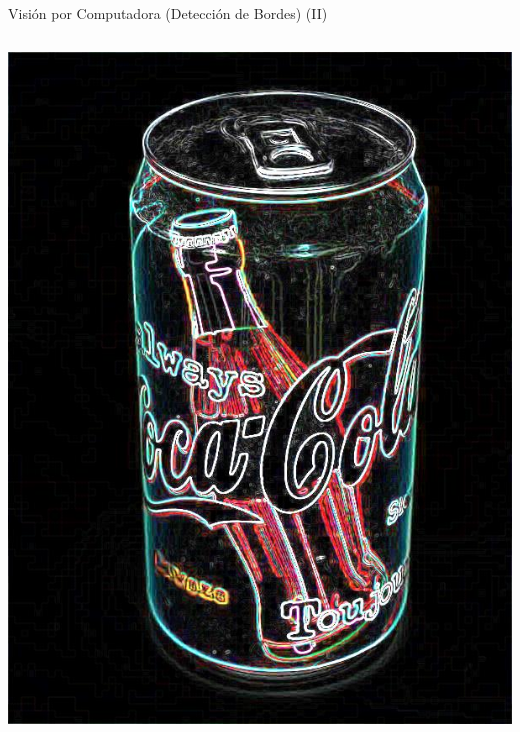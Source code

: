 \begin{frame}{Visión por Computadora (Detección de Bordes) (II)}
\begin{columns}
        \begin{center}
            \includegraphics[width=\textwidth]{Figs/VC_CocaBordes}
     \end{center}

    \end{columns}

\end{frame}


